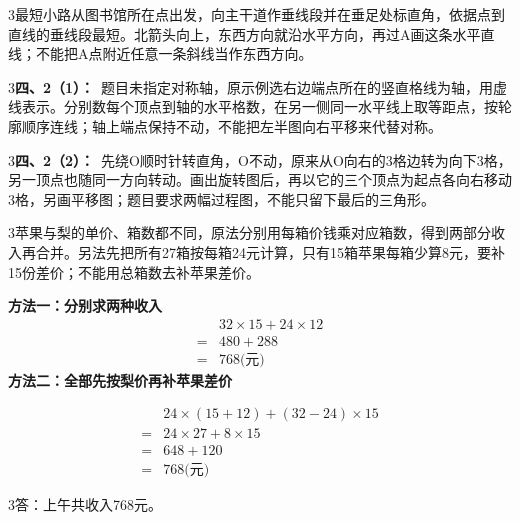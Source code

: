\documentclass[multi=snippet,border={5bp 20bp 5bp 5bp}]{standalone}
\newenvironment{snippet}[3]{\begin{minipage}{#1bp}\color{answerred}\fontsize{#2}{#3}\selectfont\raggedright}{\end{minipage}}
\begin{document}
\begin{snippet}{505}{11.5}{14}\begin{multicols}{3}\raggedcolumns 最短小路从图书馆所在点出发，向主干道作垂线段并在垂足处标直角，依据点到直线的垂线段最短。北箭头向上，东西方向就沿水平方向，再过A画这条水平直线；不能把A点附近任意一条斜线当作东西方向。\end{multicols}\end{snippet}
\begin{snippet}{505}{11.5}{14}\begin{multicols}{3}\raggedcolumns \textbf{四、2（1）：}\ 题目未指定对称轴，原示例选右边端点所在的竖直格线为轴，用虚线表示。分别数每个顶点到轴的水平格数，在另一侧同一水平线上取等距点，按轮廓顺序连线；轴上端点保持不动，不能把左半图向右平移来代替对称。\end{multicols}\end{snippet}
\begin{snippet}{505}{11.5}{14}\begin{multicols}{3}\raggedcolumns \textbf{四、2（2）：}\ 先绕O顺时针转直角，O不动，原来从O向右的3格边转为向下3格，另一顶点也随同一方向转动。画出旋转图后，再以它的三个顶点为起点各向右移动3格，另画平移图；题目要求两幅过程图，不能只留下最后的三角形。\end{multicols}\end{snippet}
\begin{snippet}{505}{11.5}{14}\begin{multicols}{3}\raggedcolumns 苹果与梨的单价、箱数都不同，原法分别用每箱价钱乘对应箱数，得到两部分收入再合并。另法先把所有27箱按每箱24元计算，只有15箱苹果每箱少算8元，要补15份差价；不能用总箱数去补苹果差价。\par \textbf{方法一：分别求两种收入}\[\begin{aligned} &32\times15+24\times12\\={}&480+288\\={}&768\text{(元)}\end{aligned}\]\textbf{方法二：全部先按梨价再补苹果差价}\end{multicols}\[\begin{aligned} &24\times(15+12)+(32-24)\times15\\={}&24\times27+8\times15\\={}&648+120\\={}&768\text{(元)}\end{aligned}\]\begin{multicols}{3}\raggedcolumns 答：上午共收入768元。\end{multicols}\end{snippet}
\end{document}
